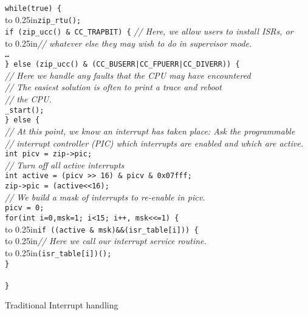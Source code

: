 \documentclass{gqtekspec}
\begin{document}
\begin{table}\begin{center}
\begin{tabbing}
{\tt while(true) \{} \\
\hbox to 0.25in{}\= {\tt zip\_rtu();}\\
	\> {\tt if (zip\_ucc() \& CC\_TRAPBIT) \{} {\em // Here, we allow users to install ISRs, or} \\
	\>\hbox to 0.25in{}\= {\em // whatever else they may wish to do in supervisor mode.} \\
	\>\> {\tt \ldots} \\
	\> {\tt \} else (zip\_ucc() \& (CC\_BUSERR|CC\_FPUERR|CC\_DIVERR)) \{}\\
	\>\> {\em // Here we handle any faults that the CPU may have
		encountered }\\
	\>\> {\em // The easiest solution is often to print a trace and reboot}\\
	\>\> {\em // the CPU.}\\
	\>\> {\tt \_start();} \\
	\> {\tt \} else \{} \\
	\> \> {\em // At this point, we know an interrupt has taken place:  Ask the programmable}\\
	\> \> {\em // interrupt controller (PIC) which interrupts are enabled and which are active.}\\
	\> \>	{\tt int	picv = zip->pic;}\\
	\> \>	{\em // Turn off all active interrupts}\\
	\> \>	{\tt int	active = (picv >> 16) \& picv \& 0x07fff;}\\
	\> \>	{\tt zip->pic = (active<<16);}\\
	\> \>	{\em // We build a mask of interrupts to re-enable in picv.}\\
	\> \>	{\tt picv = 0;}\\
	\> \>	{\tt for(int i=0,msk=1; i<15; i++, msk<<=1) \{}\\
	\> \>\hbox to 0.25in{}\={\tt if ((active \& msk)\&\&(isr\_table[i])) \{}\\
	\> \>\>\hbox to 0.25in{}\={\em // Here we call our interrupt service routine.}\\
	\> \>\>\hbox to 0.25in{}\= {\tt (isr\_table[i])(); }\\
	\> \>	{\tt \} }\\
	\>{\tt \} }\\
{\tt \}}\\
\end{tabbing}
\caption{Traditional Interrupt handling}\label{tbl:traditional-isr}
\end{center}\end{table}
\end{document}
